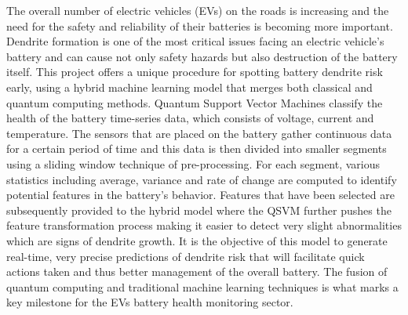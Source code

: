 The overall number of electric vehicles (EVs) on the roads is increasing and the need for the safety and reliability of their batteries is becoming more important. Dendrite formation is one of the most critical issues facing an electric vehicle's battery and can cause not only safety hazards but also destruction of the battery itself. This project offers a unique procedure for spotting battery dendrite risk early, using a hybrid machine learning model that merges both classical and quantum computing methods. Quantum Support Vector Machines classify the health of the battery time-series data, which consists of voltage, current and temperature. The sensors that are placed on the battery gather continuous data for a certain period of time and this data is then divided into smaller segments using a sliding window technique of pre-processing. For each segment, various statistics including average, variance and rate of change are computed to identify potential features in the battery's behavior. Features that have been selected are subsequently provided to the hybrid model where the QSVM further pushes the feature transformation process making it easier to detect very slight abnormalities which are signs of dendrite growth. It is the objective of this model to generate real-time, very precise predictions of dendrite risk that will facilitate quick actions taken and thus better management of the overall battery. The fusion of quantum computing and traditional machine learning techniques is what marks a key milestone for the EVs battery health monitoring sector. 